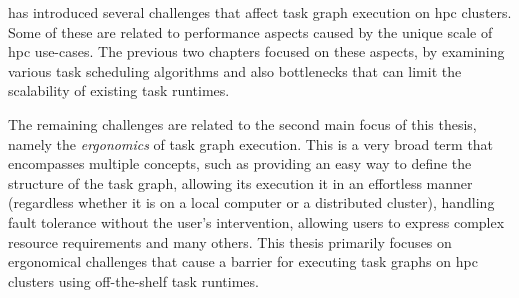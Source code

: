  has introduced several challenges that affect task graph execution on
\gls{hpc} clusters. Some of these are related to performance aspects caused by the
unique scale of \gls{hpc} use-cases. The previous two chapters focused on these aspects, by examining
various task scheduling algorithms and also bottlenecks that can limit the scalability of existing
task runtimes.

The remaining challenges are related to the second main focus of this thesis, namely the
\emph{ergonomics} of task graph execution. This is a very broad term that encompasses multiple
concepts, such as providing an easy way to define the structure of the task graph, allowing its
execution it in an effortless manner (regardless whether it is on a local computer or a distributed
cluster), handling fault tolerance without the user's intervention, allowing users to express
complex resource requirements and many others. This thesis primarily focuses on ergonomical challenges that
cause a barrier for executing task graphs on \gls{hpc} clusters using off-the-shelf task runtimes.






